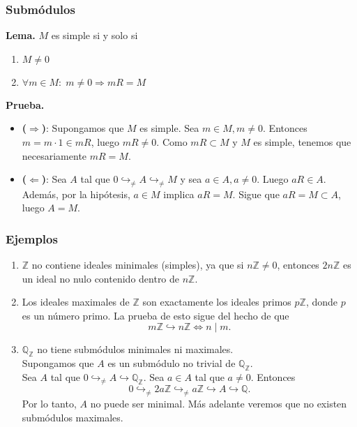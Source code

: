 \documentclass[notes=show]{beamer}%
\begin{document}
\begin{frame}
    \frametitle{Submódulos}
    \textbf{Lema.} \( M \) es simple si y solo si
    \begin{enumerate}
        \item \( M \neq 0\)
        \item \( \forall m \in M: \; m \neq 0 \Rightarrow mR = M \)
    \end{enumerate}
    \textbf{Prueba.}
    \begin{itemize}
        \item \textbf{(\( \Rightarrow \))}: 
        Supongamos que \( M \) es simple. Sea \( m \in M, m\neq 0 \). Entonces \( m = m \cdot 1 \in mR \), luego \(mR \neq 0\). 
        Como \(mR\subset M\) y \(M\) es simple, tenemos que necesariamente \( mR = M\). 
        \item \textbf{(\( \Leftarrow \))}: Sea \(A\) tal que \( 0 \hookrightarrow_{\neq} A \hookrightarrow_{\neq} M \) y sea \(a\in A, a\neq 0\).
        Luego \(aR\in A \). Además, por la hipótesis, \(a \in M\) implica \(aR = M\). Sigue que \(aR = M \subset A\), luego \(A = M\).
    \end{itemize}
\end{frame}

\begin{frame}
    \frametitle{Ejemplos}
    \begin{enumerate}
        \item \( \mathbb{Z} \) no contiene ideales minimales (simples), ya que si \( n\mathbb{Z} \neq 0 \), 
        entonces \( 2n\mathbb{Z} \) es un ideal no nulo contenido dentro de \( n\mathbb{Z} \). 
        \item Los ideales maximales de \( \mathbb{Z} \) son exactamente los ideales primos \( p\mathbb{Z} \), donde \( p \) 
        es un número primo. La prueba de esto sigue del hecho de que
        \[
        m\mathbb{Z} \hookrightarrow n\mathbb{Z} \iff n \mid m.
        \]
        \item \( \mathbb{Q}_{\mathbb{Z}} \) no tiene submódulos minimales ni maximales.\\
        Supongamos que \( A \) es un submódulo no trivial de \( \mathbb{Q}_{\mathbb{Z}} \). \\
        Sea \(A\) tal que \( 0 \hookrightarrow_{\neq} A \hookrightarrow \mathbb{Q}_{\mathbb{Z}} \). 
        Sea \( a \in A\) tal que \(a\neq 0\).
        Entonces
        \[
        0 \hookrightarrow_{\neq} 2a\mathbb{Z} \hookrightarrow_{\neq} a\mathbb{Z} \hookrightarrow A \hookrightarrow \mathbb{Q}.
        \]
        Por lo tanto, \( A \) no puede ser minimal. 
        Más adelante veremos que no existen submódulos maximales.
    \end{enumerate}
\end{frame}
\end{document}
